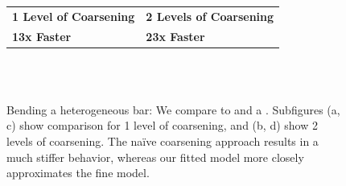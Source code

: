 \begin{figure}[t]
	\centering
	\begin{tabularx}{0.92\columnwidth}{ Y Y }
		\textbf{1 Level of Coarsening} & \textbf{\textbf{2 Levels of Coarsening}} \\
		\textbf{13x Faster} & \textbf{23x Faster}
	\end{tabularx}\\
	\\
	\caption{Bending a heterogeneous bar: We compare {\DDFEM} to {\Naive} and a {\HiRes}. Subfigures (a, c) show comparison for 
		1 level of coarsening, and (b, d) show 2 levels of
		coarsening. The na\"{i}ve coarsening
		approach results in a much stiffer behavior, whereas our fitted
		model more closely approximates the fine model.}
	\label{fig:bending}
\end{figure}
